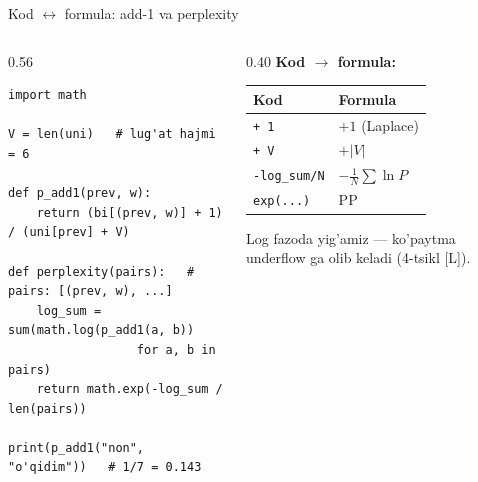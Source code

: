 \documentclass[aspectratio=169,11pt]{beamer}
\begin{document}
\begin{frame}[fragile]{Kod $\leftrightarrow$ formula: add-1 va perplexity}
  \begin{columns}[T]
    \begin{column}{0.56\textwidth}
\begin{lstlisting}
import math

V = len(uni)   # lug'at hajmi = 6

def p_add1(prev, w):
    return (bi[(prev, w)] + 1) / (uni[prev] + V)

def perplexity(pairs):   # pairs: [(prev, w), ...]
    log_sum = sum(math.log(p_add1(a, b))
                  for a, b in pairs)
    return math.exp(-log_sum / len(pairs))

print(p_add1("non", "o'qidim"))   # 1/7 = 0.143
\end{lstlisting}
    \end{column}
    \begin{column}{0.40\textwidth}
      \textbf{Kod $\to$ formula:}\\[3pt]
      \footnotesize
      \begin{tabular}{p{1.9cm}p{2.1cm}}
        \toprule
        Kod & Formula \\
        \midrule
        \texttt{+ 1} & $+1$ (Laplace) \\
        \texttt{+ V} & $+|V|$ \\
        \texttt{-log\_sum/N} & $-\frac1N\sum\ln P$ \\
        \texttt{exp(...)} & $\mathrm{PP}$ \\
        \bottomrule
      \end{tabular}
      \vspace{4pt}
      \begin{tcolorbox}[warnbox,top=2pt,bottom=2pt]
        \footnotesize
        Log fazoda yig'amiz --- ko'paytma underflow ga olib keladi
        (4-tsikl [L]).
      \end{tcolorbox}
    \end{column}
  \end{columns}
\end{frame}
\end{document}
